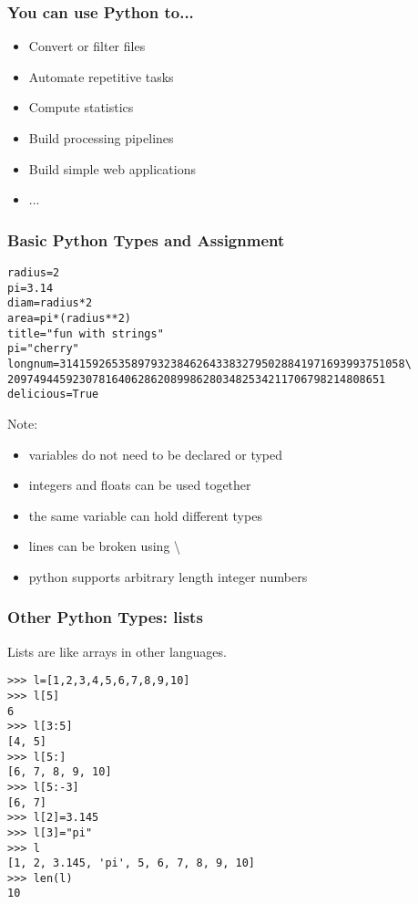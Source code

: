 \documentclass[10pt]{beamer}
\begin{document}
\begin{frame}
\frametitle{You can use Python to...}
\begin{itemize}
\item Convert or filter files
\item Automate repetitive tasks
\item Compute statistics
\item Build processing pipelines
\item Build simple web applications
\item ...
\end{itemize}
\end{frame}

\begin{frame}[fragile]
\frametitle{Basic Python Types and Assignment}

\begin{verbatim}
radius=2
pi=3.14
diam=radius*2
area=pi*(radius**2)
title="fun with strings"
pi="cherry"
longnum=31415926535897932384626433832795028841971693993751058\
2097494459230781640628620899862803482534211706798214808651
delicious=True
\end{verbatim}

Note:
\begin{itemize}
\item variables do not need to be declared or typed
\item integers and floats can be used together
\item the same variable can hold different types
\item lines can be broken using \textbackslash
\item python supports arbitrary length integer numbers
\end{itemize}
\end{frame}

\begin{frame}[fragile]
\frametitle{Other Python Types: lists}

Lists are like arrays in other languages.  
\begin{verbatim}
>>> l=[1,2,3,4,5,6,7,8,9,10]
>>> l[5]
6
>>> l[3:5]
[4, 5]
>>> l[5:]
[6, 7, 8, 9, 10]
>>> l[5:-3]
[6, 7]
>>> l[2]=3.145
>>> l[3]="pi"
>>> l
[1, 2, 3.145, 'pi', 5, 6, 7, 8, 9, 10]
>>> len(l)
10
\end{verbatim}

\end{frame}
\end{document}
